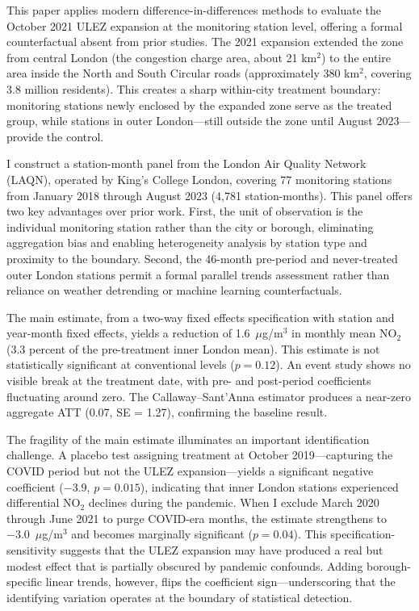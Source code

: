 \documentclass[12pt]{article}
\begin{document}
This paper applies modern difference-in-differences methods to evaluate the October 2021 ULEZ expansion at the monitoring station level, offering a formal counterfactual absent from prior studies. The 2021 expansion extended the zone from central London (the congestion charge area, about 21 km$^2$) to the entire area inside the North and South Circular roads (approximately 380 km$^2$, covering 3.8 million residents). This creates a sharp within-city treatment boundary: monitoring stations newly enclosed by the expanded zone serve as the treated group, while stations in outer London---still outside the zone until August 2023---provide the control.

I construct a station-month panel from the London Air Quality Network (LAQN), operated by King's College London, covering 77 monitoring stations from January 2018 through August 2023 (4,781 station-months). This panel offers two key advantages over prior work. First, the unit of observation is the individual monitoring station rather than the city or borough, eliminating aggregation bias and enabling heterogeneity analysis by station type and proximity to the boundary. Second, the 46-month pre-period and never-treated outer London stations permit a formal parallel trends assessment rather than reliance on weather detrending or machine learning counterfactuals.

The main estimate, from a two-way fixed effects specification with station and year-month fixed effects, yields a reduction of 1.6~$\mu$g/m$^3$ in monthly mean NO$_2$ (3.3 percent of the pre-treatment inner London mean). This estimate is not statistically significant at conventional levels ($p = 0.12$). An event study shows no visible break at the treatment date, with pre- and post-period coefficients fluctuating around zero. The Callaway--Sant'Anna estimator \citep{callawaySantanna2021} produces a near-zero aggregate ATT (0.07, SE = 1.27), confirming the baseline result.

The fragility of the main estimate illuminates an important identification challenge. A placebo test assigning treatment at October 2019---capturing the COVID period but not the ULEZ expansion---yields a significant negative coefficient ($-3.9$, $p = 0.015$), indicating that inner London stations experienced differential NO$_2$ declines during the pandemic. When I exclude March 2020 through June 2021 to purge COVID-era months, the estimate strengthens to $-3.0$~$\mu$g/m$^3$ and becomes marginally significant ($p = 0.04$). This specification-sensitivity suggests that the ULEZ expansion may have produced a real but modest effect that is partially obscured by pandemic confounds. Adding borough-specific linear trends, however, flips the coefficient sign---underscoring that the identifying variation operates at the boundary of statistical detection.
\end{document}

